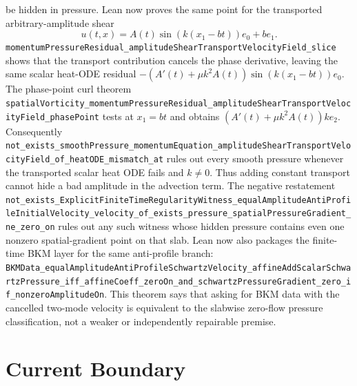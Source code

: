 \documentclass[11pt]{article}
\begin{document}
be hidden in pressure.
Lean now proves the same point for the transported arbitrary-amplitude shear
\[
  u(t,x)=A(t)\sin(k(x_1-bt))e_0+be_1 .
\]
\texttt{momentumPressureResidual\_amplitudeShearTransportVelocityField\_slice}
shows that the transport contribution cancels the phase derivative, leaving the
same scalar heat-ODE residual
\(-(A'(t)+\mu k^2A(t))\sin(k(x_1-bt))e_0\).  The phase-point curl theorem
\texttt{spatialVorticity\_momentumPressureResidual\_amplitudeShearTransportVelocityField\_phasePoint}
tests at \(x_1=bt\) and obtains
\((A'(t)+\mu k^2A(t))ke_2\).  Consequently
\texttt{not\_exists\_smoothPressure\_momentumEquation\_amplitudeShearTransportVelocityField\_of\_heatODE\_mismatch\_at}
rules out every smooth pressure whenever the transported scalar heat ODE fails
and \(k\neq0\).  Thus adding constant transport cannot hide a bad amplitude in
the advection term.
The negative restatement
\texttt{not\_exists\_ExplicitFiniteTimeRegularityWitness\_equalAmplitudeAntiProfileInitialVelocity\_velocity\_of\_exists\_pressure\_spatialPressureGradient\_ne\_zero\_on}
rules out any such witness whose hidden pressure contains even one nonzero
spatial-gradient point on that slab.
Lean now also packages the finite-time BKM layer for the same anti-profile
branch:
\texttt{BKMData\_equalAmplitudeAntiProfileSchwartzVelocity\_affineAddScalarSchwartzPressure\_iff\_affineCoeff\_zeroOn\_and\_schwartzPressureGradient\_zero\_if\_nonzeroAmplitudeOn}.
This theorem says that asking for BKM data with the cancelled two-mode velocity
is equivalent to the slabwise zero-flow pressure classification, not a weaker
or independently repairable premise.

\section{Current Boundary}
\end{document}

